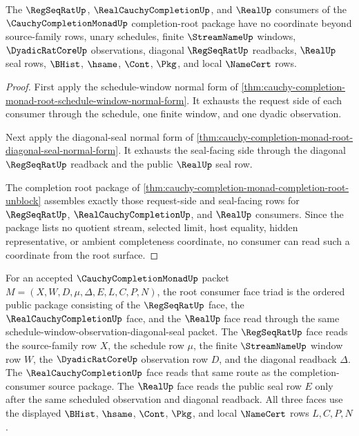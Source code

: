 \begin{theorem}
\label{thm:cauchy-completion-monad-root-consumer-exhaustion}
The $\RegSeqRatUp$, $\RealCauchyCompletionUp$, and $\RealUp$ consumers of the $\CauchyCompletionMonadUp$ completion-root package have no coordinate beyond source-family rows, unary schedules, finite $\StreamNameUp$ windows, $\DyadicRatCoreUp$ observations, diagonal $\RegSeqRatUp$ readbacks, $\RealUp$ seal rows, $\BHist$, $\hsame$, $\Cont$, $\Pkg$, and local $\NameCert$ rows.
\end{theorem}
\begin{proof}
First apply the schedule-window normal form of \autoref{thm:cauchy-completion-monad-root-schedule-window-normal-form}. It exhausts the request side of each consumer through the schedule, one finite window, and one dyadic observation.

Next apply the diagonal-seal normal form of \autoref{thm:cauchy-completion-monad-root-diagonal-seal-normal-form}. It exhausts the seal-facing side through the diagonal $\RegSeqRatUp$ readback and the public $\RealUp$ seal row.

The completion root package of \autoref{thm:cauchy-completion-monad-completion-root-unblock} assembles exactly those request-side and seal-facing rows for $\RegSeqRatUp$, $\RealCauchyCompletionUp$, and $\RealUp$ consumers. Since the package lists no quotient stream, selected limit, host equality, hidden representative, or ambient completeness coordinate, no consumer can read such a coordinate from the root surface.
\end{proof}

\begin{definition}
\label{def:cauchy-completion-monad-root-consumer-face-triad}
For an accepted $\CauchyCompletionMonadUp$ packet $M=(X,W,D,\mu,\Delta,E,L,C,P,N)$, the root consumer face triad is the ordered public package consisting of the $\RegSeqRatUp$ face, the $\RealCauchyCompletionUp$ face, and the $\RealUp$ face read through the same schedule-window-observation-diagonal-seal packet. The $\RegSeqRatUp$ face reads the source-family row $X$, the schedule row $\mu$, the finite $\StreamNameUp$ window row $W$, the $\DyadicRatCoreUp$ observation row $D$, and the diagonal readback $\Delta$. The $\RealCauchyCompletionUp$ face reads that same route as the completion-consumer source package. The $\RealUp$ face reads the public seal row $E$ only after the same scheduled observation and diagonal readback. All three faces use the displayed $\BHist$, $\hsame$, $\Cont$, $\Pkg$, and local $\NameCert$ rows $L,C,P,N$.
\end{definition}

